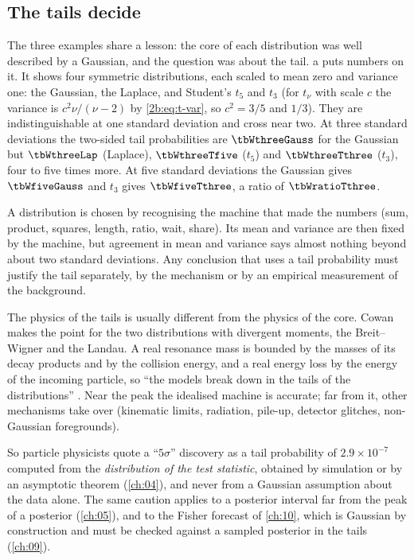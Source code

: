 \subsection{The tails decide}
\label{2b:sec:which-tails}

The three examples share a lesson: the core of each distribution was well described by a Gaussian, and the question was about the tail. a puts numbers on it. It shows four symmetric distributions, each scaled to mean zero and variance one: the Gaussian, the Laplace, and Student's $t_5$ and $t_3$ (for $t_\nu$ with scale $c$ the variance is $c^2\nu/(\nu-2)$ by \eqref{2b:eq:t-var}, so $c^2=3/5$ and $1/3$). They are indistinguishable at one standard deviation and cross near two. At three standard deviations the two-sided tail probabilities are $\tbWthreeGauss$ for the Gaussian but $\tbWthreeLap$ (Laplace), $\tbWthreeTfive$ ($t_5$) and $\tbWthreeTthree$ ($t_3$), four to five times more. At five standard deviations the Gaussian gives $\tbWfiveGauss$ and $t_3$ gives $\tbWfiveTthree$, a ratio of $\tbWratioTthree$.

\begin{keyidea}
A distribution is chosen by recognising the machine that made the numbers (sum, product, squares, length, ratio, wait, share). Its mean and variance are then fixed by the machine, but agreement in mean and variance says almost nothing beyond about two standard deviations. Any conclusion that uses a tail probability must justify the tail separately, by the mechanism or by an empirical measurement of the background.
\end{keyidea}

The physics of the tails is usually different from the physics of the core. Cowan makes the point for the two distributions with divergent moments, the Breit--Wigner and the Landau. A real resonance mass is bounded by the masses of its decay products and by the collision energy, and a real energy loss by the energy of the incoming particle, so ``the models break down in the tails of the distributions'' . Near the peak the idealised machine is accurate; far from it, other mechanisms take over (kinematic limits, radiation, pile-up, detector glitches, non-Gaussian foregrounds).

So particle physicists quote a ``$5\sigma$'' discovery as a tail probability of $2.9\times10^{-7}$ computed from the \emph{distribution of the test statistic}, obtained by simulation or by an asymptotic theorem (\cref{ch:04}), and never from a Gaussian assumption about the data alone. The same caution applies to a posterior interval far from the peak of a posterior (\cref{ch:05}), and to the Fisher forecast of \cref{ch:10}, which is Gaussian by construction and must be checked against a sampled posterior in the tails (\cref{ch:09}).

